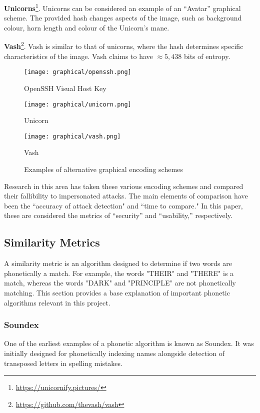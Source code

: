 \textbf{Unicorns}\footnote{\url{https://unicornify.pictures/}}. Unicorns can be considered an example of an ``Avatar'' graphical scheme. The provided hash changes aspects of the image, such as background colour, horn length and colour of the Unicorn's mane.

\textbf{Vash}\footnote{\url{https://github.com/thevash/vash}}. Vash is similar to that of unicorns, where the hash determines specific characteristics of the image. Vash claims to have $\approx 5,438$ bits of entropy.

\begin{figure}[h!]
    \centering
        \texttt{[image: graphical/openssh.png]}
        \caption{OpenSSH Visual Host Key}
    \endminipage
        \texttt{[image: graphical/unicorn.png]}
        \caption{Unicorn}
    \endminipage
        \texttt{[image: graphical/vash.png]}
        \caption{Vash}
    \endminipage
    \caption{Examples of alternative graphical encoding schemes}
\end{figure}

Research in this area has taken these various encoding schemes and compared their fallibility to impersonated attacks. The main elements of comparison have been the ``accuracy of attack detection" and ``time to compare." In this paper, these are considered the metrics of ``security'' and ``usability,'' respectively.

\subsection{Similarity Metrics}
\label{sec:similarity_metric}
A similarity metric is an algorithm designed to determine if two words are phonetically a match. For example, the words "THEIR" and "THERE" is a match, whereas the words "DARK" and "PRINCIPLE" are not phonetically matching. This section provides a base explanation of important phonetic algorithms relevant in this project.

\subsubsection*{Soundex}
\label{sec:soundex}
One of the earliest examples of a phonetic algorithm is known as Soundex. It was initially designed for phonetically indexing names alongside detection of transposed letters in spelling mistakes. 

